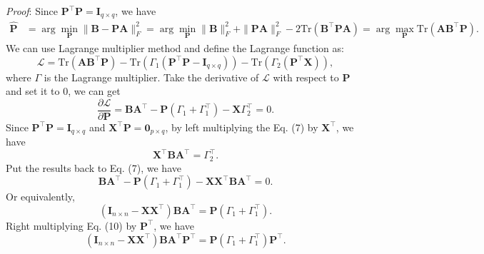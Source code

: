 \documentclass[titlepage,11pt,twoside]{article}
\begin{document}
\emph{Proof}:
Since $\mathbf{P}^{\top}\mathbf{P} = \mathbf{I}_{q\times q}$, we have
\begin{equation}
\begin{split}
\mathbf{\hat{P}}
&
=\arg\min_{\mathbf{P}}\|\mathbf{B}-\mathbf{P}\mathbf{A}\|_{F}^{2}
=\arg\min_{\mathbf{P}}\|\mathbf{B}\|_{F}^{2}+\|\mathbf{P}\mathbf{A}\|_{F}^{2}-2\text{Tr}(\mathbf{B}^{\top}\mathbf{P}\mathbf{A})
=\arg\max_{\mathbf{P}}\text{Tr}(\mathbf{A}\mathbf{B}^{\top}\mathbf{P}).
\end{split}
\end{equation}
We can use Lagrange multiplier method and define the Lagrange function as:
\begin{equation}
\mathcal{L}
=
\text{Tr}(\mathbf{A}\mathbf{B}^{\top}\mathbf{P})
-
\text{Tr}(\Gamma_{1}(\mathbf{P}^{\top}\mathbf{P} - \mathbf{I}_{q\times q}))
-
\text{Tr}(\Gamma_{2}(\mathbf{P}^{\top}\mathbf{X}))
,
\end{equation}
where $\Gamma$ is the Lagrange multiplier. Take the derivative of $\mathcal{L}$ with respect to $\mathbf{P}$ and set it to 0, we can get
\begin{equation}
\frac{\partial \mathcal{L}}{\partial \mathbf{P}} 
=
\mathbf{B}\mathbf{A}^{\top}
-
\mathbf{P}(\Gamma_{1}+\Gamma_{1}^{\top})
-
\mathbf{X}\Gamma_{2}^{\top}
=
0.
\end{equation}
Since $\mathbf{P}^{\top}\mathbf{P}=\mathbf{I}_{q\times q}$ and $\mathbf{X}^{\top}\mathbf{P} = \mathbf{0}_{p\times q}$, by left multiplying the Eq. (7) by $\mathbf{X}^{\top}$, we have 
\begin{equation}
\mathbf{X}^{\top}\mathbf{B}\mathbf{A}^{\top}
=
\Gamma_{2}^{\top}.
\end{equation}
Put the results back to Eq. (7), we have 
\begin{equation}
\mathbf{B}\mathbf{A}^{\top}
-
\mathbf{P}(\Gamma_{1}+\Gamma_{1}^{\top})
-
\mathbf{X}\mathbf{X}^{\top}\mathbf{B}\mathbf{A}^{\top}
=
0.
\end{equation}
Or equivalently,
\begin{equation}
(\mathbf{I}_{n\times n}-\mathbf{X}\mathbf{X}^{\top})\mathbf{B}\mathbf{A}^{\top}
=
\mathbf{P}(\Gamma_{1}+\Gamma_{1}^{\top}).
\end{equation}
Right multiplying Eq. (10) by $\mathbf{P}^{\top}$, we have
\begin{equation}
(\mathbf{I}_{n\times n}-\mathbf{X}\mathbf{X}^{\top})\mathbf{B}\mathbf{A}^{\top}\mathbf{P}^{\top}
=
\mathbf{P}(\Gamma_{1}+\Gamma_{1}^{\top})\mathbf{P}^{\top}
.
\end{equation}
\end{document}
